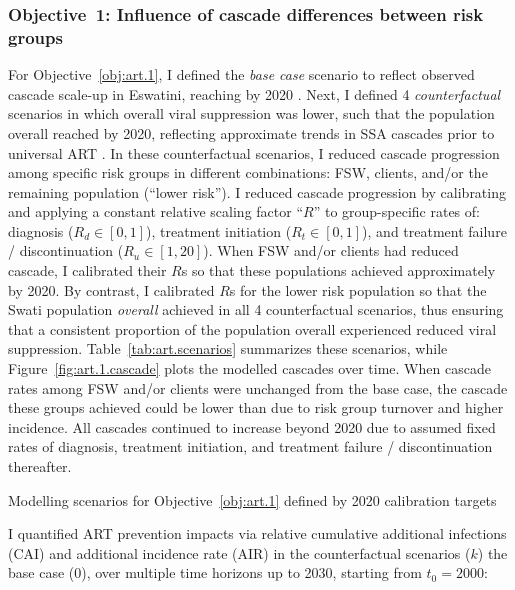 \subsubsection{Objective~1: Influence of cascade differences between risk groups}\label{art.meth.obj.1}
For Objective~\ref{obj:art.1},
I defined the \emph{base case} scenario to reflect
observed cascade scale-up in Eswatini, reaching \cashi by 2020 \cite{AIDSinfo}.
Next, I defined 4 \emph{counterfactual} scenarios in which overall viral suppression was lower,
such that the population overall reached \casmd by 2020,
reflecting approximate trends in SSA cascades prior to universal ART \cite{AIDSinfo}.
In these counterfactual scenarios, I reduced cascade progression
among specific risk groups in different combinations:
FSW, clients, and/or the remaining population (``lower risk'').
I reduced cascade progression by calibrating and applying
a constant relative scaling factor ``$R$'' to group-specific rates of:
diagnosis ($R_d \in [0,1]$),
treatment initiation ($R_t \in [0,1]$), and
treatment failure / discontinuation ($R_u \in [1,20]$).
When FSW and/or clients had reduced cascade, I calibrated their $R$s so that
these populations achieved approximately \caslo by 2020.
By contrast, I calibrated $R$s for the lower risk population so that
the Swati population \emph{overall} achieved \casmd in all 4 counterfactual scenarios,
thus ensuring that a consistent proportion of the population overall
experienced reduced viral suppression.
Table~\ref{tab:art.scenarios} summarizes these scenarios, while
Figure~\ref{fig:art.1.cascade} plots the modelled cascades over time.
When cascade rates among FSW and/or clients were unchanged from the base case,
the cascade these groups achieved could be lower than \cashi
due to risk group turnover and higher incidence.
All cascades continued to increase beyond 2020 due to assumed fixed rates of
diagnosis, treatment initiation, and treatment failure / discontinuation thereafter.
\begin{table}
  \centering
  \caption{Modelling scenarios for Objective~\ref{obj:art.1} defined by 2020 calibration targets}
  \label{tab:art.scenarios}
  
\end{table}
\par
I quantified ART prevention impacts via relative
cumulative additional infections (CAI) and additional incidence rate (AIR)
in the counterfactual scenarios ($k$) \vs the base case ($0$),
over multiple time horizons up to 2030, starting from $t_0 = 2000$:

